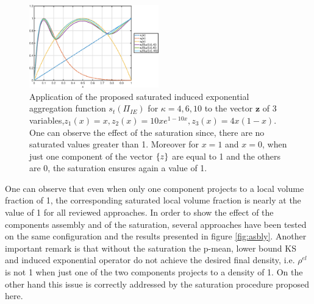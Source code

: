 \begin{figure}[!ht]
\centering
  \includegraphics[width=0.5\textwidth]{images/Ch3/iebenchsat.eps}
\caption{Application of the proposed saturated induced exponential aggregation function $s_t(\Pi_{IE})$ for $\kappa=4,6,10$ to the vector $\mathbf{z}$ of 3 variables,$z_1(x)=x,z_2(x)=10xe^{1-10x},z_3(x)=4x(1-x)$. One can observe the effect of the saturation since, there are no saturated values greater than 1. Moreover for $x=1$ and $x=0$, when just one component of the vector  $\left\{{z}\right\}$ are equal to 1 and the others are 0, the saturation ensures again a value of 1.}
\label{fig:ibs}       %
\end{figure}
 One can observe that even when only one component projects to a local volume fraction of 1, the corresponding saturated local volume fraction is nearly at the value of 1 for all reviewed approaches. In order to show the effect of the components assembly and of the saturation, several approaches have been tested on the same configuration and the results presented in figure \ref{fig:asbly}. Another important remark is that without the saturation the p-mean, lower bound KS and induced exponential operator do not achieve the desired final density, i.e. $\rho^{el}$ is not 1 when just one of the two components projects to a density of 1. On the other hand this issue is correctly addressed by the saturation procedure proposed here. \newpage
